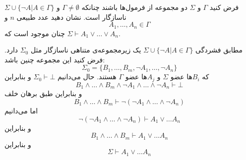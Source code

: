 فرض کنید $\Gamma$ و $\Sigma$ دو مجموعه از فرمول‌ها باشند چنانکه $\Gamma\neq\emptyset$ و
$\Sigma\cup\{\neg A|A\in\Gamma\}$
ناسازگار است. نشان دهید عدد طبیعی $n$ و
$$
A_1,\ldots,A_n\in\Gamma
$$
چنان موجود است که
$\Sigma\vdash A_1\vee\ldots\vee A_n$.
\begin{ans}
  مطابق فشردگی
  $\Sigma\cup\{\neg A|A\in\Gamma\}$
  یک زیرمجموعه‌ی متناهی ناسازگار مثل
  $\Sigma_0$
  دارد. فرض کنید این مجموعه چنین باشد:
  $$
  \Sigma_0 = \{B_1,\ldots,B_m,\neg A_1,\ldots,\neg A_n\}
  $$
  که $B_i$ها عضو $\Sigma$ و $A_j$ها عضو $\Gamma$ هستند. حال می‌دانیم
  $\Sigma_0\vdash\bot$
  و بنابراین
  $$B_1\wedge\ldots\wedge B_m\wedge \neg A_1\wedge\ldots\wedge\neg A_n\vdash\bot$$
  و بنابراین طبق برهان خلف
  $$B_1\wedge\ldots\wedge B_m\vdash\neg(\neg A_1\wedge\ldots\wedge\neg A_n)$$
  اما می‌دانیم
  $$\neg(\neg A_1\wedge\ldots\wedge \neg A_n)\vdash A_1\vee\ldots A_n$$
  و بنابراین
  $$B_1\wedge\ldots\wedge B_m\vdash A_1\vee\ldots A_n$$
  و بنابراین
  $$\Sigma\vdash A_1\vee\ldots A_n$$
\end{ans}